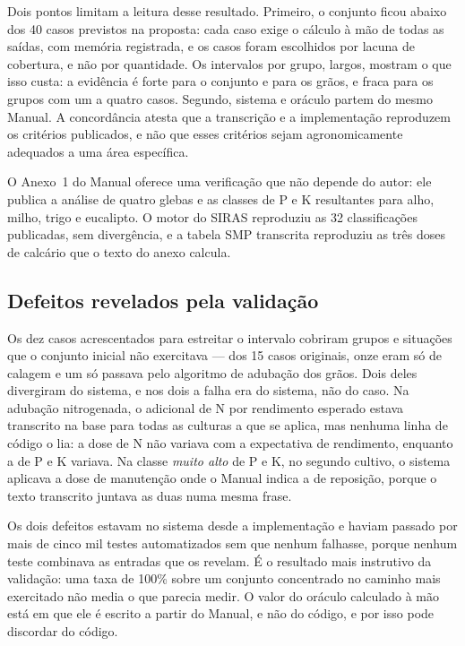 Dois pontos limitam a leitura desse resultado. Primeiro, o conjunto ficou abaixo dos 40 casos
previstos na proposta: cada caso exige o cálculo à mão de todas as saídas, com memória
registrada, e os casos foram escolhidos por lacuna de cobertura, e não por quantidade. Os
intervalos por grupo, largos, mostram o que isso custa: a evidência é forte para o conjunto e
para os grãos, e fraca para os grupos com um a quatro casos. Segundo, sistema e oráculo partem do
mesmo Manual. A concordância atesta que a transcrição e a implementação reproduzem os critérios
publicados, e não que esses critérios sejam agronomicamente adequados a uma área específica.

O Anexo~1 do Manual oferece uma verificação que não depende do autor: ele publica a análise de
quatro glebas e as classes de P e K resultantes para alho, milho, trigo e eucalipto. O motor do
SIRAS reproduziu as 32 classificações publicadas, sem divergência, e a tabela SMP transcrita
reproduziu as três doses de calcário que o texto do anexo calcula.

\subsection{Defeitos revelados pela validação}\label{sec:res_defeitos}

Os dez casos acrescentados para estreitar o intervalo cobriram grupos e situações que o conjunto
inicial não exercitava --- dos 15 casos originais, onze eram só de calagem e um só passava
pelo algoritmo de adubação dos grãos. Dois deles divergiram do sistema, e nos dois a falha era do
sistema, não do caso. Na adubação nitrogenada, o adicional de N por rendimento esperado estava
transcrito na base para todas as culturas a que se aplica, mas nenhuma linha de código o lia: a
dose de N não variava com a expectativa de rendimento, enquanto a de P e K variava. Na classe
\emph{muito alto} de P e K, no segundo cultivo, o sistema aplicava a dose de manutenção onde o
Manual indica a de reposição, porque o texto transcrito juntava as duas numa mesma frase.

Os dois defeitos estavam no sistema desde a implementação e haviam passado por mais de cinco mil
testes automatizados sem que nenhum falhasse, porque nenhum teste combinava as entradas que os
revelam. É o resultado mais instrutivo da validação: uma taxa de 100\% sobre um conjunto
concentrado no caminho mais exercitado não media o que parecia medir. O valor do oráculo
calculado à mão está em que ele é escrito a partir do Manual, e não do código, e por isso pode
discordar do código.

